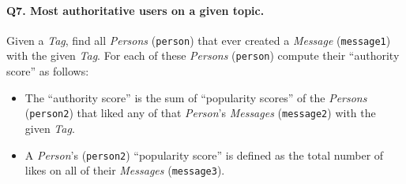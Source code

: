 \paragraph{\textbf{Q7}. Most authoritative users on a given topic.}
Given a \emph{Tag}, find all \emph{Persons} (\texttt{person}) that ever
created a \emph{Message} (\texttt{message1}) with the given \emph{Tag}.
For each of these \emph{Persons} (\texttt{person}) compute their
``authority score'' as follows:
\begin{itemize}
\tightlist
\item
  The ``authority score'' is the sum of ``popularity scores'' of the
  \emph{Persons} (\texttt{person2}) that liked any of that
  \emph{Person}'s \emph{Messages} (\texttt{message2}) with the given
  \emph{Tag}.
\item
  A \emph{Person}'s (\texttt{person2}) ``popularity score'' is defined
  as the total number of likes on all of their \emph{Messages}
  (\texttt{message3}).
\end{itemize}
